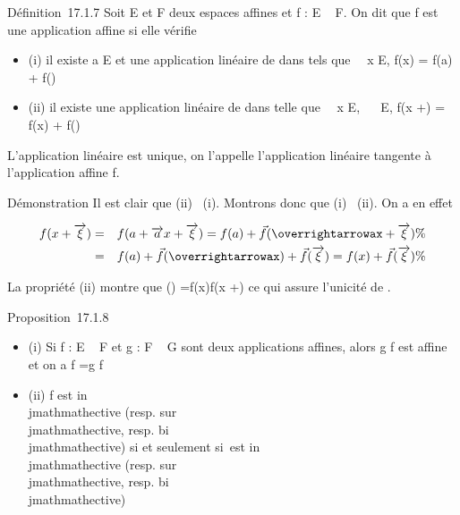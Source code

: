 \documentclass[]{article}
\begin{document}
Définition~17.1.7 Soit E et F deux espaces affines et f : E \rightarrow~ F. On dit
que f est une application affine si elle vérifie

\begin{itemize}
\itemsep1pt\parskip0pt
\item
  (i) il existe a \in E et une application linéaire
  \vecf de \overrightarrowE dans
  \overrightarrowF tels que
  \forall~~x \in E, f(x) = f(a) +\vec
  f(\overrightarrowax)
\item
  (ii) il existe une application linéaire \vecf de
  \overrightarrowE dans
  \overrightarrowF telle que
  \forall~~x \in E,
  \forall~\overrightarrow\xi~
  \in\overrightarrow E, f(x
  +\overrightarrow \xi) = f(x) +\vec
  f(\overrightarrow\xi)
\end{itemize}

L'application linéaire \vecf est unique, on l'appelle
l'application linéaire tangente à l'application affine f.

Démonstration Il est clair que (ii) \rigtharrow~(i). Montrons donc que (i) \rigtharrow~(ii).
On a en effet

\begin{align*} f(x +\overrightarrow
\xi)& =& f(a +\overrightarrow ax
+\overrightarrow \xi) = f(a) +\vec
f(\overrightarrowax
+\overrightarrow \xi) \%&
\\ & =& f(a) +\vec
f(\overrightarrowax) +\vec
f(\overrightarrow\xi) = f(x) +\vec
f(\overrightarrow\xi)\%&
\\ \end{align*}

La propriété (ii) montre que
\vecf(\overrightarrow\xi)
=\overrightarrow f(x)f(x
+\overrightarrow \xi) ce qui assure l'unicité de
\vecf.

Proposition~17.1.8

\begin{itemize}
\itemsep1pt\parskip0pt
\item
  (i) Si f : E \rightarrow~ F et g : F \rightarrow~ G sont deux applications affines, alors g
  \cdot f est affine et on a \overrightarrowg \cdot f
  =\vec g \cdot\vec f
\item
  (ii) f est in\\jmathmathective (resp. sur\\jmathmathective, resp. bi\\jmathmathective) si et
  seulement si~\vecf est in\\jmathmathective (resp. sur\\jmathmathective,
  resp. bi\\jmathmathective)
\end{itemize}
\end{document}

